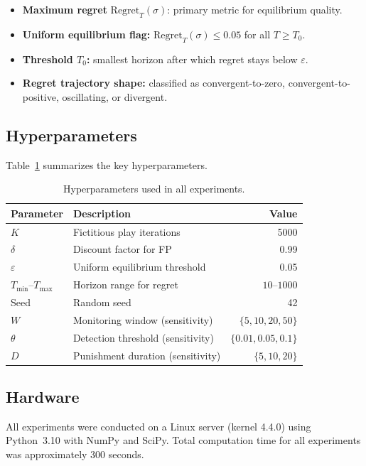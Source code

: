 \documentclass[11pt,a4paper]{article}
\theoremstyle{definition}
\newcommand{\eps}{\varepsilon}
\newcommand{\Regret}{\mathrm{Regret}}
\begin{document}
\begin{itemize}[leftmargin=1.5em]
    \item \textbf{Maximum regret} $\Regret_T(\sigma)$: primary metric for equilibrium quality.
    \item \textbf{Uniform equilibrium flag:} $\Regret_T(\sigma) \leq 0.05$ for all $T \geq T_0$.
    \item \textbf{Threshold $T_0$:} smallest horizon after which regret stays below $\eps$.
    \item \textbf{Regret trajectory shape:} classified as convergent-to-zero, convergent-to-positive, oscillating, or divergent.
\end{itemize}

\subsection{Hyperparameters}

Table~\ref{tab:hyperparams} summarizes the key hyperparameters.

\begin{table}[t]
\centering
\caption{Hyperparameters used in all experiments.}\label{tab:hyperparams}
\begin{tabular}{@{}llr@{}}
\toprule
\textbf{Parameter} & \textbf{Description} & \textbf{Value} \\
\midrule
$K$ & Fictitious play iterations & 5000 \\
$\delta$ & Discount factor for FP & 0.99 \\
$\eps$ & Uniform equilibrium threshold & 0.05 \\
$T_{\min}$--$T_{\max}$ & Horizon range for regret & $10$--$1000$ \\
Seed & Random seed & 42 \\
\midrule
$W$ & Monitoring window (sensitivity) & $\{5, 10, 20, 50\}$ \\
$\theta$ & Detection threshold (sensitivity) & $\{0.01, 0.05, 0.1\}$ \\
$D$ & Punishment duration (sensitivity) & $\{5, 10, 20\}$ \\
\bottomrule
\end{tabular}
\end{table}

\subsection{Hardware}

All experiments were conducted on a Linux server (kernel 4.4.0) using Python~3.10 with NumPy and SciPy.
Total computation time for all experiments was approximately 300 seconds.
\end{document}

